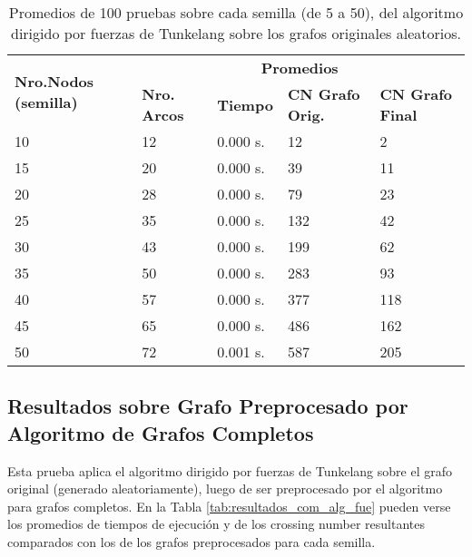 \begin{table}[H]
	\caption{Promedios de 100 pruebas sobre cada semilla (de 5 a 50), del algoritmo dirigido por fuerzas de Tunkelang sobre los grafos originales aleatorios.}
	\label{tab:resultados_orig_alg_fue}
	\begin{tabularx}{\linewidth}{|X|X|p{1.5cm}|X|X|}
		\hline
		\multirow{2}{2cm}{\textbf{Nro.Nodos (semilla)}} & \multicolumn{4}{c|}{\textbf{Promedios}} \\
		\cline{2-5}
		& \textbf{Nro. Arcos} & \textbf{Tiempo} & \textbf{CN Grafo Orig.} & \textbf{CN Grafo Final} \\
		\hline
		10 & 12 & 0.000 s. & 12 & 2 \\
		\hline
		15 & 20 & 0.000 s. & 39 & 11 \\
		\hline
		20 & 28 & 0.000 s. & 79 & 23 \\
		\hline
		25 & 35 & 0.000 s. & 132 & 42 \\
		\hline
		30 & 43 & 0.000 s. & 199 & 62 \\
		\hline
		35 & 50 & 0.000 s. & 283 & 93 \\
		\hline
		40 & 57 & 0.000 s. & 377 & 118 \\
		\hline
		45 & 65 & 0.000 s. & 486 & 162 \\
		\hline
		50 & 72 & 0.001 s. & 587 & 205 \\
		\hline
	\end{tabularx}
\end{table}

\subsection{Resultados sobre Grafo Preprocesado por Algoritmo de Grafos Completos}
Esta prueba aplica el algoritmo dirigido por fuerzas de Tunkelang sobre el grafo original (generado aleatoriamente), luego de ser preprocesado por el algoritmo para grafos completos. En la Tabla \ref{tab:resultados_com_alg_fue} pueden verse los promedios de tiempos de ejecución y de los crossing number resultantes comparados con los de los grafos preprocesados para cada semilla.

